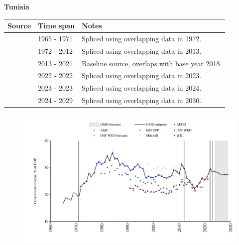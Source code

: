 \documentclass[12pt,a4paper,landscape]{article}
\begin{document}
\begin{adjustbox}{max totalsize={\paperwidth}{\paperheight},center}
\begin{minipage}[t][\textheight][t]{\textwidth}
\vspace*{0.5cm}
{}
\begin{center}
{\Large\bfseries Tunisia}
\end{center}
\vspace{0.5cm}
\begin{table}[H]
\centering
\small
\begin{tabular}{|l|l|l|}
\hline
\textbf{Source} & \textbf{Time span} & \textbf{Notes} \\
\hline
\rowcolor{white}\cite{Mitchell}& 1965 - 1971 &Spliced using overlapping data in 1972.\\
\rowcolor{lightgray}\cite{WDI}& 1972 - 2012 &Spliced using overlapping data in 2013.\\
\rowcolor{white}\cite{AMF}& 2013 - 2021 &Baseline source, overlaps with base year 2018.\\
\rowcolor{lightgray}\cite{IMF_WEO}& 2022 - 2022 &Spliced using overlapping data in 2023.\\
\rowcolor{white}\cite{IMF_FPP}& 2023 - 2023 &Spliced using overlapping data in 2024.\\
\rowcolor{lightgray}\cite{IMF_WEO_forecast}& 2024 - 2029 &Spliced using overlapping data in 2030.\\
\hline
\end{tabular}
\end{table}
\begin{figure}[H]
\centering
\includegraphics[width=\textwidth,height=0.6\textheight,keepaspectratio]{graphs/TUN_govrev_GDP.pdf}
\end{figure}
\end{minipage}
\end{adjustbox}
\end{document}
